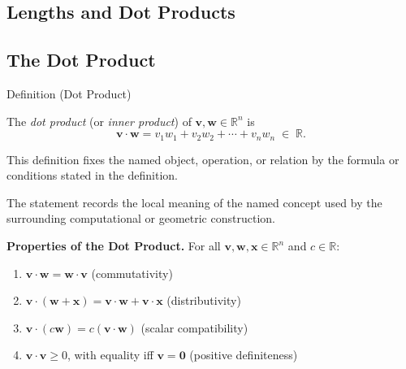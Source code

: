 
\subsection{Lengths and Dot Products}

\subsection*{The Dot Product}

\begin{definitionbox}{Definition (Dot Product)}
\begin{definition}
\label{def:dot-product}
The \emph{dot product} (or \emph{inner product}) of $\mathbf{v}, \mathbf{w} \in \mathbb{R}^n$ is
\[
  \mathbf{v} \cdot \mathbf{w} = v_1 w_1 + v_2 w_2 + \cdots + v_n w_n \;\in\; \mathbb{R}.
\]
\end{definition}
\end{definitionbox}
\begin{remark*}
This definition fixes the named object, operation, or relation by the formula
or conditions stated in the definition.
\end{remark*}

\begin{remark*}[Interpretation]
The statement records the local meaning of the named concept used by the
surrounding computational or geometric construction.
\end{remark*}

\DefinitionalRoot

\begin{remark*}[Exposition]
\textbf{Properties of the Dot Product.}
For all $\mathbf{v}, \mathbf{w}, \mathbf{x} \in \mathbb{R}^n$ and $c \in \mathbb{R}$:
\begin{enumerate}
  \item $\mathbf{v} \cdot \mathbf{w} = \mathbf{w} \cdot \mathbf{v}$ \hfill (commutativity)
  \item $\mathbf{v} \cdot (\mathbf{w} + \mathbf{x}) = \mathbf{v} \cdot \mathbf{w} + \mathbf{v} \cdot \mathbf{x}$ \hfill (distributivity)
  \item $\mathbf{v} \cdot (c\mathbf{w}) = c(\mathbf{v} \cdot \mathbf{w})$ \hfill (scalar compatibility)
  \item $\mathbf{v} \cdot \mathbf{v} \geq 0$, with equality iff $\mathbf{v} = \mathbf{0}$ \hfill (positive definiteness)
\end{enumerate}
\end{remark*}

